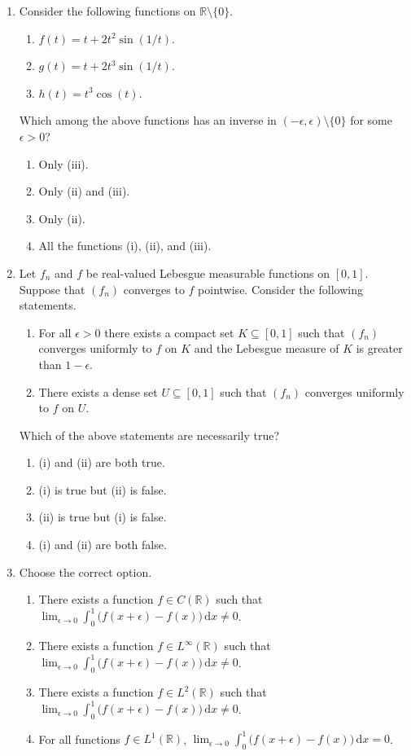 \documentclass[11pt, a4paper]{article}
\begin{document}
\begin{enumerate}[resume]
\item Consider the following functions on $\mathbb{R}\setminus\{0\}$.
\begin{enumerate}[label=(\roman*)]
\item $f(t)=t+2t^2\sin(1/t)$.
\item $g(t)=t+2t^3\sin(1/t)$.
\item $h(t)=t^3\cos(t)$.
\end{enumerate}
Which among the above functions has an inverse in $(-\epsilon,\epsilon)\setminus\{0\}$ for some $\epsilon>0$?
\begin{enumerate}[label=(\alph*)]
\item Only (iii).
\item Only (ii) and (iii).
\item Only (ii).
\item All the functions (i), (ii), and (iii).
\end{enumerate}

\item Let $f_n$ and $f$ be real-valued Lebesgue measurable functions on $[0,1]$. Suppose that $(f_n)$ converges to $f$ pointwise. Consider the following statements.
\begin{enumerate}[label=(\roman*)]
\item For all $\epsilon>0$ there exists a compact set $K\subseteq[0,1]$ such that $(f_n)$ converges uniformly to $f$ on $K$ and the Lebesgue measure of $K$ is greater than $1-\epsilon$.
\item There exists a dense set $U\subseteq[0,1]$ such that $(f_n)$ converges uniformly to $f$ on $U$.
\end{enumerate}
Which of the above statements are necessarily true?
\begin{enumerate}[label=(\alph*)]
\item (i) and (ii) are both true.
\item (i) is true but (ii) is false.
\item (ii) is true but (i) is false.
\item (i) and (ii) are both false.
\end{enumerate}

\item Choose the correct option.
\begin{enumerate}[label=(\alph*)]
\item There exists a function $f\in C(\mathbb{R})$ such that $\displaystyle\lim_{\epsilon\to0}\int_0^1\bigl(f(x+\epsilon)-f(x)\bigr)\,\mathrm{d} x\ne0$.
\item There exists a function $f\in L^\infty(\mathbb{R})$ such that $\displaystyle\lim_{\epsilon\to0}\int_0^1\bigl(f(x+\epsilon)-f(x)\bigr)\,\mathrm{d} x\ne0$.
\item There exists a function $f\in L^2(\mathbb{R})$ such that $\displaystyle\lim_{\epsilon\to0}\int_0^1\bigl(f(x+\epsilon)-f(x)\bigr)\,\mathrm{d} x\ne0$.
\item For all functions $f\in L^1(\mathbb{R})$, $\displaystyle\lim_{\epsilon\to0}\int_0^1\bigl(f(x+\epsilon)-f(x)\bigr)\,\mathrm{d} x=0$.
\end{enumerate}


\end{enumerate}
\end{document}
